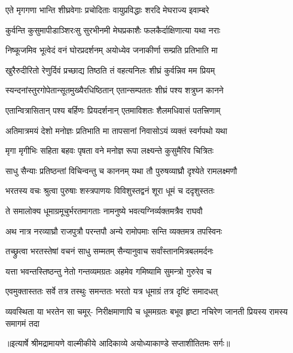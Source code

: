 \twolineshloka
{एते मृगगणा भान्ति शीघ्रवेगाः प्रचोदिताः}
{वायुप्रविद्धाः शरदि मेघराज्य इवाम्बरे} %

\twolineshloka
{कुर्वन्ति कुसुमापीडाञ्शिरःसु सुरभीनमी}
{मेघप्रकाशैः फलकैर्दाक्षिणात्या यथा नराः} %

\twolineshloka
{निष्कूजमिव भूत्वेदं वनं घोरप्रदर्शनम्}
{अयोध्येव जनाकीर्णा सम्प्रति प्रतिभाति मा} %

\twolineshloka
{खुरैरुदीरितो रेणुर्दिवं प्रच्छाद्य तिष्ठति}
{तं वहत्यनिलः शीघ्रं कुर्वन्निव मम प्रियम्} %

\twolineshloka
{स्यन्दनांस्तुरगोपेतान्सूतमुख्यैरधिष्ठितान्}
{एतान्सम्पततः शीघ्रं पश्य शत्रुघ्न कानने} %

\twolineshloka
{एतान्वित्रासितान् पश्य बर्हिणः प्रियदर्शनान्}
{एतमाविशतः शैलमधिवासं पतत्त्रिणाम्} %

\twolineshloka
{अतिमात्रमयं देशो मनोज्ञः प्रतिभाति मा}
{तापसानां निवासोऽयं व्यक्तं स्वर्गपथो यथा} %

\twolineshloka
{मृगा मृगीभिः सहिता बहवः पृषता वने}
{मनोज्ञ रूपा लक्ष्यन्ते कुसुमैरिव चित्रितः} %

\twolineshloka
{साधु सैन्याः प्रतिष्ठन्तां विचिन्वन्तु च काननम्}
{यथा तौ पुरुषव्याघ्रौ दृश्येते रामलक्ष्मणौ} %

\twolineshloka
{भरतस्य वचः श्रुत्वा पुरुषाः शस्त्रपाणयः}
{विविशुस्तद्वनं शूरा धूमं च ददृशुस्ततः} %

\twolineshloka
{ते समालोक्य धूमाग्रमूचुर्भरतमागताः}
{नामनुष्ये भवत्यग्निर्व्यक्तमत्रैव राघवौ} %

\twolineshloka
{अथ नात्र नरव्याघ्रौ राजपुत्रौ परन्तपौ}
{अन्ये रामोपमाः सन्ति व्यक्तमत्र तपस्विनः} %

\twolineshloka
{तच्छ्रुत्वा भरतस्तेषां वचनं साधु सम्मतम्}
{सैन्यानुवाच सर्वांस्तानमित्रबलमर्दनः} %

\twolineshloka
{यत्ता भवन्तस्तिष्ठन्तु नेतो गन्तव्यमग्रतः}
{अहमेव गमिष्यामि सुमन्त्रो गुरुरेव च} %

\twolineshloka
{एवमुक्तास्ततः सर्वे तत्र तस्थुः समन्ततः}
{भरतो यत्र धूमाग्रं तत्र दृष्टिं समादधत्} %

\fourlineindentedshloka
{व्यवस्थिता या भरतेन सा चमूर्-}
{निरीक्षमाणापि च धूममग्रतः}
{बभूव हृष्टा नचिरेण जानती}
{प्रियस्य रामस्य समागमं तदा} %


{॥इत्यार्षे श्रीमद्रामायणे वाल्मीकीये आदिकाव्ये अयोध्याकाण्डे सप्ताशीतितमः सर्गः॥}

